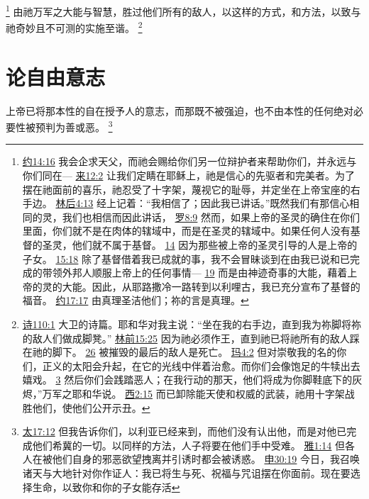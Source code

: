 \documentclass[12pt, a4paper, oneside]{ctexart}
\newcounter{parnum}[section]
\newcommand{\N}{%
   \noindent\refstepcounter{parnum}%
    \makebox[\parindent][l]{\textbf{\arabic{parnum}.}}}
\begin{document}
	\footnote {
		\href{https://biblehub.com/john/14-16.htm}{约14:16} 我会企求天父，而祂会赐给你们另一位辩护者来帮助你们，并永远与你们同在---
		\href{https://biblehub.com/hebrews/12-2.htm}{来12:2} 让我们定睛在耶稣上，祂是信心的先驱者和完美者。为了摆在祂面前的喜乐，祂忍受了十字架，蔑视它的耻辱，并定坐在上帝宝座的右手边。
		\href{https://biblehub.com/2_corinthians/4-13.htm}{林后4:13} 经上记着：“我相信了；因此我已讲话。”既然我们有那信心相同的灵，我们也相信而因此讲话，
		\href{https://biblehub.com/romans/8-9.htm}{罗8:9} 然而，如果上帝的圣灵的确住在你们里面，你们就不是在肉体的辖域中，而是在圣灵的辖域中。如果任何人没有基督的圣灵，他们就不属于基督。
		\href{https://biblehub.com/romans/8-14.htm}{14} 因为那些被上帝的圣灵引导的人是上帝的子女。
		\href{https://biblehub.com/romans/15-18.htm}{15:18} 除了基督借着我已成就的事，我不会冒昧谈到在由我已说和已完成的带领外邦人顺服上帝上的任何事情---
		\href{https://biblehub.com/romans/15-19.htm}{19} 而是由神迹奇事的大能，藉着上帝的灵的大能。因此，从耶路撒冷一路转到以利哩古，我已充分宣布了基督的福音。
		\href{https://biblehub.com/john/17-17.htm}{约17:17} 由真理圣洁他们；祢的言是真理。
	}
	由祂万军之大能与智慧，胜过他们所有的敌人，以这样的方式，和方法，以致与祂奇妙且不可测的实施至谐。
	\footnote {
		\href{https://biblehub.com/psalms/110-1.htm}{诗110:1} 大卫的诗篇。耶和华对我主说：“坐在我的右手边，直到我为祢脚将祢的敌人们做成脚凳。”
		\href{https://biblehub.com/1_corinthians/15-25.htm}{林前15:25} 因为祂必须作王，直到祂已将祂所有的敌人踩在祂的脚下。
		\href{https://biblehub.com/1_corinthians/15-26.htm}{26} 被摧毁的最后的敌人是死亡。
		\href{https://biblehub.com/malachi/4-2.htm}{玛4:2} 但对崇敬我的名的你们，正义的太阳会升起，在它的光线中伴着治愈。而你们会像饱足的牛犊出去嬉戏。
		\href{https://biblehub.com/malachi/4-3.htm}{3} 然后你们会践踏恶人；在我行动的那天，他们将成为你脚鞋底下的灰烬，”万军之耶和华说。
		\href{https://biblehub.com/colossians/2-15.htm}{西2:15} 而已卸除能天使和权威的武装，祂用十字架战胜他们，使他们公开示丑。
	}

\section{论自由意志}

\N 上帝已将那本性的自在授予人的意志，而那既不被强迫，也不由本性的任何绝对必要性被预判为善或恶。
	\footnote {
		\href{https://biblehub.com/matthew/17-12.htm}{太17:12} 但我告诉你们，以利亚已经来到，而他们没有认出他，而是对他已完成他们希冀的一切。以同样的方法，人子将要在他们手中受难。
		\href{https://biblehub.com/james/1-14.htm}{雅1:14} 但各人在被他们自身的邪恶欲望拽离并引诱时都会被诱惑。
		\href{https://biblehub.com/deuteronomy/30-19.htm}{申30:19} 今日，我召唤诸天与大地针对你作证人：我已将生与死、祝福与咒诅摆在你面前。现在要选择生命，以致你和你的子女能存活
	}
\end{document}
